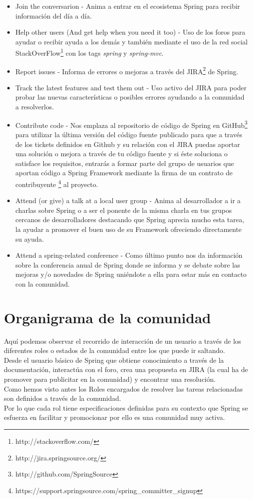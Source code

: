 \documentclass[11pt]{scrartcl}
\begin{document}
\begin{itemize}
    \item Join the conversarion - Anima a entrar en el ecosistema Spring para recibir información del día a día.
    \item Help other users (And get help when you need it too) - Uso de los foros para ayudar o recibir ayuda a los demás y también mediante el uso de la red social StackOverFlow\footnote{http://stackoverflow.com/} con los tags \emph{spring} y \emph{spring-mvc}.
    \item Report issues - Informa de errores o mejoras a través del JIRA\footnote{http://jira.springsource.org/} de Spring.
    \item Track the latest features and test them out - Uso activo del JIRA para poder probar las nuevas características o posibles errores ayudando a la comunidad a resolverlos.
    \item Contribute code - Nos emplaza al repositorio de código de Spring en GitHub\footnote{http://github.com/SpringSource} para utilizar la última versión del código fuente publicado para que a través de los tickets definidos en Github y su relación con el JIRA puedas aportar una solución o mejora a través de tu código fuente y si éste soluciona o satisface los requisitos, entrarás a formar parte del grupo de usuarios que aportan código a Spring Framework mediante la firma de un contrato de contribuyente \footnote{https://support.springsource.com/spring\_committer\_signup} al proyecto.
    \item Attend (or give) a talk at a local user group - Anima al desarrollador a ir a charlas sobre Spring o a ser el ponente de la misma charla en tus grupos cercanos de desarrolladores destacando que Spring aprecia mucho esta tarea, la ayudar a promover el buen uso de su Framework ofreciendo directamente su ayuda.
    \item Attend a spring-related conference - Como último punto nos da información sobre la conferencia anual de Spring donde se informa y se debate sobre las mejoras y/o novedades de Spring uniéndote a ella para estar más en contacto con la comunidad.
\end{itemize}

\section{Organigrama de la comunidad}

Aquí podemos observar el recorrido de interacción de un usuario a través de los diferentes roles o estados de la comunidad entre los que puede ir saltando.\\
Desde el usuario básico de Spring que obtiene conocimiento a través de la documentación, interactúa con el foro, crea una propuesta en JIRA (la cual ha de promover para publicitar en la comunidad) y encontrar una resolución.\\
Como hemos visto antes los Roles encargados de resolver las tareas relacionadas son definidos a través de la comunidad.\\
Por lo que cada rol tiene especificaciones definidas para su contexto que Spring se esfuerza en facilitar y promocionar por ello es una comunidad muy activa.
\end{document}
